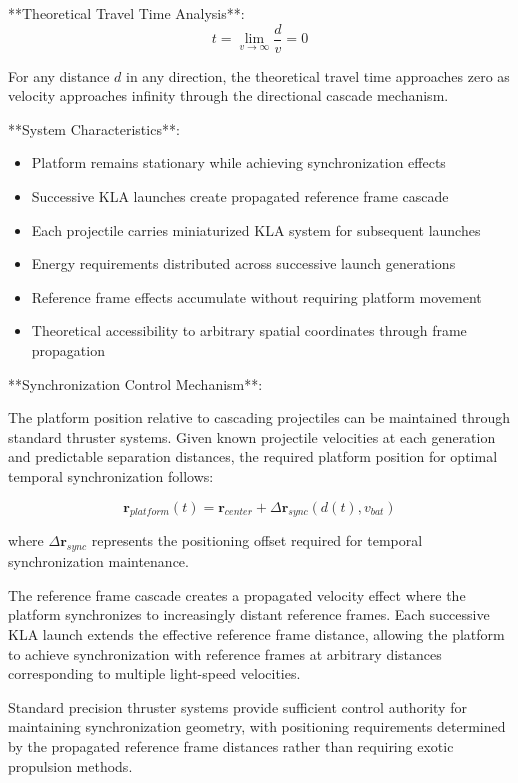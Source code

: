 \documentclass[12pt,a4paper]{article}
\theoremstyle{remark}
\begin{document}
**Theoretical Travel Time Analysis**:
\begin{equation}
t = \lim_{v \to \infty} \frac{d}{v} = 0
\end{equation}

For any distance $d$ in any direction, the theoretical travel time approaches zero as velocity approaches infinity through the directional cascade mechanism.

**System Characteristics**:
\begin{itemize}
\item Platform remains stationary while achieving synchronization effects
\item Successive KLA launches create propagated reference frame cascade
\item Each projectile carries miniaturized KLA system for subsequent launches
\item Energy requirements distributed across successive launch generations
\item Reference frame effects accumulate without requiring platform movement
\item Theoretical accessibility to arbitrary spatial coordinates through frame propagation
\end{itemize}

**Synchronization Control Mechanism**:

The platform position relative to cascading projectiles can be maintained through standard thruster systems. Given known projectile velocities at each generation and predictable separation distances, the required platform position for optimal temporal synchronization follows:

\begin{equation}
\mathbf{r}_{platform}(t) = \mathbf{r}_{center} + \Delta\mathbf{r}_{sync}(d(t), v_{bat})
\end{equation}

where $\Delta\mathbf{r}_{sync}$ represents the positioning offset required for temporal synchronization maintenance.

The reference frame cascade creates a propagated velocity effect where the platform synchronizes to increasingly distant reference frames. Each successive KLA launch extends the effective reference frame distance, allowing the platform to achieve synchronization with reference frames at arbitrary distances corresponding to multiple light-speed velocities.

Standard precision thruster systems provide sufficient control authority for maintaining synchronization geometry, with positioning requirements determined by the propagated reference frame distances rather than requiring exotic propulsion methods.
\end{document}
